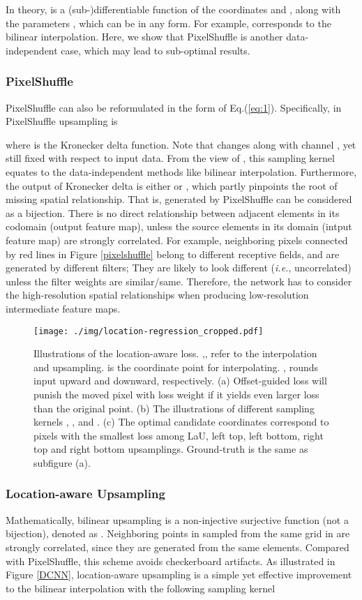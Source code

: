 \documentclass[10pt,twocolumn,letterpaper]{article}
\begin{document}
In theory,  is a (sub-)differentiable function of the coordinates  and , along with the parameters , which can be in any form. For example,  corresponds to the bilinear interpolation. Here, we show that PixelShuffle is another data-independent case, which may lead to sub-optimal results.

\subsubsection{PixelShuffle}
PixelShuffle can also be reformulated in the form of Eq.(\ref{eq:1}). Specifically,  in PixelShuffle  upsampling is

where  is the Kronecker delta function. Note that  changes along with channel , yet still fixed with respect to input data. From the view of , this sampling kernel equates to the data-independent methods like bilinear interpolation. Furthermore, the output of Kronecker delta is either  or , which partly pinpoints the root of missing spatial relationship. That is,  generated by PixelShuffle can be considered as a bijection. There is no direct relationship between adjacent elements in its codomain (output feature map), unless the source elements in its domain (intput feature map) are strongly correlated. For example, neighboring pixels connected by red lines in Figure \ref{pixelshuffle} belong to different receptive fields, and are generated by different filters; They are likely to look different (\textit{i.e.}, uncorrelated) unless the filter weights are similar/same. Therefore, the network has to consider the high-resolution spatial relationships when producing low-resolution intermediate feature maps.

\begin{figure*}
  \centering
  \texttt{[image: ./img/location-regression\_cropped.pdf]} 
  \caption{Illustrations of the location-aware loss. ,, refer to the interpolation and upsampling.  is the coordinate point for interpolating. , rounds input upward and downward, respectively. (a) Offset-guided loss will punish the moved pixel with loss weight  if it yields even larger loss than the original point. (b) The illustrations of different sampling kernels , ,  and . (c) The optimal candidate coordinates correspond to pixels with the smallest loss among LaU, left top, left bottom, right top and right bottom upsamplings. Ground-truth is the same as subfigure (a).}
\label{loss}
\end{figure*}

\subsubsection{Location-aware Upsampling}
Mathematically, bilinear upsampling is a non-injective surjective function (not a bijection), denoted as . Neighboring points in  sampled from the same grid in  are strongly correlated, since they are generated from the same elements. Compared with PixelShuffle, this scheme avoids checkerboard artifacts. As illustrated in Figure \ref{DCNN}, location-aware upsampling is a simple yet effective improvement to the bilinear interpolation with the following sampling kernel
\end{document}
